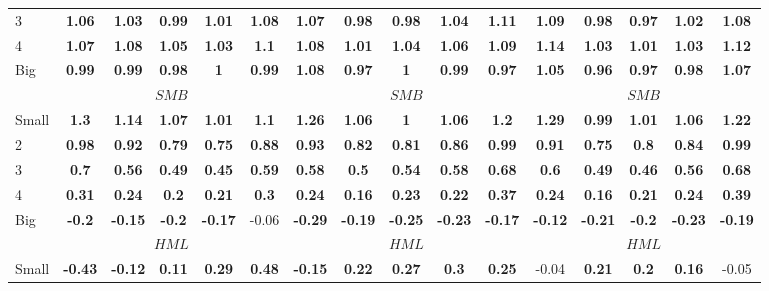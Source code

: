 \begin{table}[H]
\begin{tabular}{lccccc|ccccc|ccccc}
3 & \textbf{1.06} & \textbf{1.03} & \textbf{0.99} & \textbf{1.01} & \textbf{1.08} & \textbf{1.07} & \textbf{0.98} & \textbf{0.98} & \textbf{1.04} & \textbf{1.11} & \textbf{1.09} & \textbf{0.98} & \textbf{0.97} & \textbf{1.02} & \textbf{1.08} \\
4 & \textbf{1.07} & \textbf{1.08} & \textbf{1.05} & \textbf{1.03} & \textbf{1.1} & \textbf{1.08} & \textbf{1.01} & \textbf{1.04} & \textbf{1.06} & \textbf{1.09} & \textbf{1.14} & \textbf{1.03} & \textbf{1.01} & \textbf{1.03} & \textbf{1.12} \\
Big & \textbf{0.99} & \textbf{0.99} & \textbf{0.98} & \textbf{1} & \textbf{0.99} & \textbf{1.08} & \textbf{0.97} & \textbf{1} & \textbf{0.99} & \textbf{0.97} & \textbf{1.05} & \textbf{0.96} & \textbf{0.97} & \textbf{0.98} & \textbf{1.07} \\
 & \multicolumn{5}{c|}{$SMB$} & \multicolumn{5}{c|}{$SMB$} & \multicolumn{5}{c}{$SMB$} \\
Small & \textbf{1.3} & \textbf{1.14} & \textbf{1.07} & \textbf{1.01} & \textbf{1.1} & \textbf{1.26} & \textbf{1.06} & \textbf{1} & \textbf{1.06} & \textbf{1.2} & \textbf{1.29} & \textbf{0.99} & \textbf{1.01} & \textbf{1.06} & \textbf{1.22} \\
2 & \textbf{0.98} & \textbf{0.92} & \textbf{0.79} & \textbf{0.75} & \textbf{0.88} & \textbf{0.93} & \textbf{0.82} & \textbf{0.81} & \textbf{0.86} & \textbf{0.99} & \textbf{0.91} & \textbf{0.75} & \textbf{0.8} & \textbf{0.84} & \textbf{0.99} \\
3 & \textbf{0.7} & \textbf{0.56} & \textbf{0.49} & \textbf{0.45} & \textbf{0.59} & \textbf{0.58} & \textbf{0.5} & \textbf{0.54} & \textbf{0.58} & \textbf{0.68} & \textbf{0.6} & \textbf{0.49} & \textbf{0.46} & \textbf{0.56} & \textbf{0.68} \\
4 & \textbf{0.31} & \textbf{0.24} & \textbf{0.2} & \textbf{0.21} & \textbf{0.3} & \textbf{0.24} & \textbf{0.16} & \textbf{0.23} & \textbf{0.22} & \textbf{0.37} & \textbf{0.24} & \textbf{0.16} & \textbf{0.21} & \textbf{0.24} & \textbf{0.39} \\
Big & \textbf{-0.2} & \textbf{-0.15} & \textbf{-0.2} & \textbf{-0.17} & -0.06 & \textbf{-0.29} & \textbf{-0.19} & \textbf{-0.25} & \textbf{-0.23} & \textbf{-0.17} & \textbf{-0.12} & \textbf{-0.21} & \textbf{-0.2} & \textbf{-0.23} & \textbf{-0.19} \\
 & \multicolumn{5}{c|}{$HML$} & \multicolumn{5}{c|}{$HML$} & \multicolumn{5}{c}{$HML$} \\
Small & \textbf{-0.43} & \textbf{-0.12} & \textbf{0.11} & \textbf{0.29} & \textbf{0.48} & \textbf{-0.15} & \textbf{0.22} & \textbf{0.27} & \textbf{0.3} & \textbf{0.25} & -0.04 & \textbf{0.21} & \textbf{0.2} & \textbf{0.16} & -0.05 \\

\end{tabular}
\end{table}
